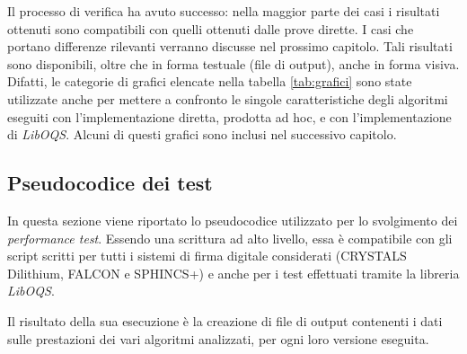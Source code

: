 Il processo di verifica ha avuto successo: nella maggior parte dei casi i risultati ottenuti sono compatibili con quelli ottenuti dalle prove dirette. I casi che portano differenze rilevanti verranno discusse nel prossimo capitolo. Tali risultati sono disponibili, oltre che in forma testuale (file di output), anche in forma visiva. Difatti, le categorie di grafici elencate nella tabella \ref{tab:grafici} sono state utilizzate anche per mettere a confronto le singole caratteristiche degli algoritmi eseguiti con l'implementazione diretta, prodotta ad hoc, e con l'implementazione di \textit{LibOQS}. Alcuni di questi grafici sono inclusi nel successivo capitolo.

\subsection{Pseudocodice dei test} 

In questa sezione viene riportato lo pseudocodice utilizzato per lo svolgimento dei \textit{performance test}. Essendo una scrittura ad alto livello, essa è compatibile con gli script scritti per tutti i sistemi di firma digitale considerati (CRYSTALS Dilithium, FALCON e SPHINCS+) e anche per i test effettuati tramite la libreria \textit{LibOQS}.

Il risultato della sua esecuzione è la creazione di file di output contenenti i dati sulle prestazioni dei vari algoritmi analizzati, per ogni loro versione eseguita.

